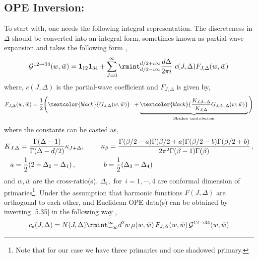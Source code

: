 \subsection*{OPE Inversion:}
To start with, one needs the following integral representation. The discreteness in $\Delta$ should be converted into an integral form, sometimes known as partial-wave expansion \cite{Dolan:2003hv,Costa:2012cb} and takes the following form \cite{Caron-Huot:2017vep},
\begin{align}
\mathcal{G}^{12\to 34}(w,\bar w)=\mathbf{1}_{12}\mathbf{1}_{34}+\sum_{J=0}^\infty\rmint_{d/2-i\infty}^{d/2+i\infty}\frac{d\Delta}{2\pi i} \,\,c(J,\Delta)F_{J,\Delta}(w,\bar w)\label{5.35}
\end{align}
where, $c(J,\Delta)$ is the partial-wave coefficient and $F_{J,\Delta}$ is given by,
\begin{align}F_{J,\Delta}(w,\bar w)=\frac{1}{2}\Bigg(\textcolor{black}{G_{J,\Delta}(w,\bar w)}\hspace{0.2cm}+\underbrace{\textcolor{black}{\frac{K_{J,d-\Delta}}{K_{J,\Delta}}G_{J,d-\Delta}(w,\bar w)}}_{\text{Shadow contribution}}\Bigg)\end{align}
where the constants can be casted as,
\begin{align}
   & K_{J,\Delta}=\frac{\Gamma(\Delta-1)}{\Gamma(\Delta-d/2)}\kappa_{J+\Delta},\,\,\,\,\,\,\,\,\,\,\,\,\,\,\kappa_{\beta}=\frac{\Gamma(\beta/2-a)\Gamma(\beta/2+a)\Gamma(\beta/2-b)\Gamma(\beta/2+b)}{2\pi^2\Gamma(\beta-1)\Gamma(\beta)}\,,\\& \hspace{0.3cm}a=\frac{1}{2}(2-\Delta_2-\Delta_1)\,,\quad \quad\quad\quad
b=\frac{1}{2}(\Delta_3-\Delta_4)\nonumber
\end{align}
and $w,\bar w$ are the cross-ratio(s). $\Delta_i, \text{ for } \, i=1,\cdots,4$ are conformal dimension of primaries\footnote{Note that for our case we have three primaries and one shadowed primary.}. Under the assumption that  harmonic functions $F(J,\Delta)$ are orthogonal to each other, and Euclidean OPE data(s) can be obtained by inverting \eqref{5.35} in the following way \cite{Caron-Huot:2017vep} ,
\begin{align}
    c_{\texttt{s}}(J,\Delta)=N(J,\Delta)\rmint_{-\infty}^{\infty} d^2w\,\mu(w,\bar w)\,F_{J,\Delta}(w,\bar w)\,\mathcal{G}^{12\to 34}(w,\bar w)\label{4.46p}
\end{align}

